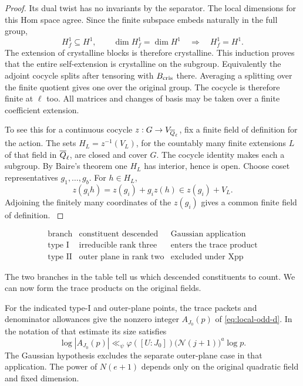 \begin{proof}
Its dual twist has no
invariants by the separator. The local dimensions for this Hom space agree. Since the finite subspace embeds naturally in the full group,
\[
 H_f^1\subseteq H^1,\qquad \dim H_f^1=\dim H^1\quad\Longrightarrow\quad H_f^1=H^1 .
\]
The extension of crystalline blocks is therefore crystalline. This induction proves that the entire
self-extension is crystalline on the subgroup. Equivalently
the adjoint cocycle splits after tensoring with
\(B_{\rm cris}\) there. Averaging a splitting over the
finite quotient gives one over the original group. The
cocycle is therefore finite at \(\ell\) too. All matrices
and changes of basis may be taken over a finite
coefficient extension.

To see this for a continuous cocycle \(z:G\to V_{\overline{Q}_\ell}\), fix a finite field of definition for the action. The sets \(H_L=z^{-1}(V_L)\), for the countably many finite extensions \(L\) of that field in \(\overline{Q}_\ell\), are closed and cover \(G\). The cocycle identity makes each a subgroup. By Baire's theorem one \(H_L\) has interior, hence is open. Choose coset representatives \(g_1,\ldots,g_b\). For \(h\in H_L\),
\[
             z(g_i h)=z(g_i)+g_i z(h)\in z(g_i)+V_L .
\]
Adjoining the finitely many coordinates of the \(z(g_i)\) gives a common finite field of definition.
\hfill\mbox{\cite{bloch-kato-finite}}

\end{proof}

\begin{construction}
\[
\begin{array}{lll}
\text{branch}&\text{constituent descended}&\text{Gaussian application}\\ \hline
\text{type I}&\text{irreducible rank three}&\text{enters the trace product}\\
\text{type II}&\text{outer plane in rank two}&\text{excluded under }\mathrm{Xpp}
\end{array}
\]
\caption{The two possible branches at a two-sided point. The exclusion in the Gaussian application uses the residual vanishing assumption for the outer plane.}\label{fig:descent-trace-branches}
\end{construction}

The two branches in the table tell us which descended constituents to count. We can
now form the trace products on the original fields.

\begin{proposition}
\label{prop:original-packet-count}
For the indicated type-I and outer-plane points, the trace
packets and denominator allowances give the nonzero integer \(A_{J_0}(p)\) of \eqref{eq:local-odd-d}.
In the notation of that estimate its size satisfies
\[
 \log |A_{J_0}(p)|\ll_\psi
   \varphi([U:J_0])\bigl(\mathcal N(j+1)\bigr)^a\log p .
\] The Gaussian hypothesis excludes the separate
outer-plane case in that application. The power of
\(N(e+1)\) depends only on the original quadratic field and
fixed dimension.
\end{proposition}


